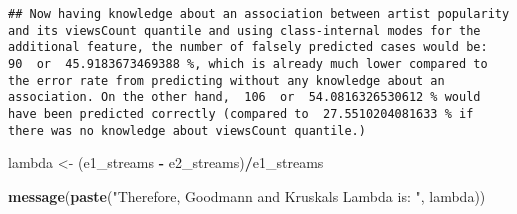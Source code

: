 \documentclass[
]{article}
\newenvironment{Shaded}{\begin{snugshade}}{\end{snugshade}}
\newcommand{\DecValTok}[1]{\textcolor[rgb]{0.00,0.00,0.81}{#1}}
\newcommand{\KeywordTok}[1]{\textcolor[rgb]{0.13,0.29,0.53}{\textbf{#1}}}
\newcommand{\NormalTok}[1]{#1}
\newcommand{\OperatorTok}[1]{\textcolor[rgb]{0.81,0.36,0.00}{\textbf{#1}}}
\newcommand{\StringTok}[1]{\textcolor[rgb]{0.31,0.60,0.02}{#1}}
\begin{document}
\begin{Shaded}
\end{Shaded}

\begin{verbatim}
## Now having knowledge about an association between artist popularity and its viewsCount quantile and using class-internal modes for the additional feature, the number of falsely predicted cases would be:  90  or  45.9183673469388 %, which is already much lower compared to the error rate from predicting without any knowledge about an association. On the other hand,  106  or  54.0816326530612 % would have been predicted correctly (compared to  27.5510204081633 % if there was no knowledge about viewsCount quantile.)
\end{verbatim}

\begin{Shaded}
\begin{Highlighting}[]
\NormalTok{lambda <-}\StringTok{ }\NormalTok{(e1_streams }\OperatorTok{-}\StringTok{ }\NormalTok{e2_streams)}\OperatorTok{/}\NormalTok{e1_streams}

\KeywordTok{message}\NormalTok{(}\KeywordTok{paste}\NormalTok{(}\StringTok{"Therefore, Goodmann and Kruskals Lambda is: "}\NormalTok{, lambda))}
\end{Highlighting}
\end{Shaded}
\end{document}
